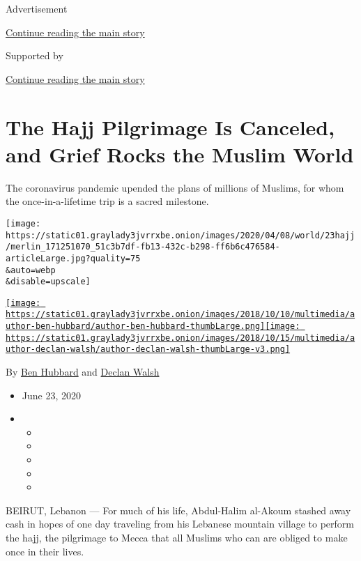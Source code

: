 Advertisement

\protect\hyperlink{after-top}{Continue reading the main story}

Supported by

\protect\hyperlink{after-sponsor}{Continue reading the main story}

\hypertarget{the-hajj-pilgrimage-is-canceled-and-grief-rocks-the-muslim-world}{%
\section{The Hajj Pilgrimage Is Canceled, and Grief Rocks the Muslim
World}\label{the-hajj-pilgrimage-is-canceled-and-grief-rocks-the-muslim-world}}

The coronavirus pandemic upended the plans of millions of Muslims, for
whom the once-in-a-lifetime trip is a sacred milestone.

\texttt{[image: https://static01.graylady3jvrrxbe.onion/images/2020/04/08/world/23hajj/merlin\_171251070\_51c3b7df-fb13-432c-b298-ff6b6c476584-articleLarge.jpg?quality=75\\\&auto=webp\\\&disable=upscale]}

\href{https://www.nytimes3xbfgragh.onion/by/ben-hubbard}{\texttt{[image: https://static01.graylady3jvrrxbe.onion/images/2018/10/10/multimedia/author-ben-hubbard/author-ben-hubbard-thumbLarge.png]}}\href{https://www.nytimes3xbfgragh.onion/by/declan-walsh}{\texttt{[image: https://static01.graylady3jvrrxbe.onion/images/2018/10/15/multimedia/author-declan-walsh/author-declan-walsh-thumbLarge-v3.png]}}

By \href{https://www.nytimes3xbfgragh.onion/by/ben-hubbard}{Ben Hubbard}
and \href{https://www.nytimes3xbfgragh.onion/by/declan-walsh}{Declan
Walsh}

\begin{itemize}
\item
  June 23, 2020
\item
  \begin{itemize}
  \item
  \item
  \item
  \item
  \item
  \end{itemize}
\end{itemize}

BEIRUT, Lebanon --- For much of his life, Abdul-Halim al-Akoum stashed
away cash in hopes of one day traveling from his Lebanese mountain
village to perform the hajj, the pilgrimage to Mecca that all Muslims
who can are obliged to make once in their lives.

